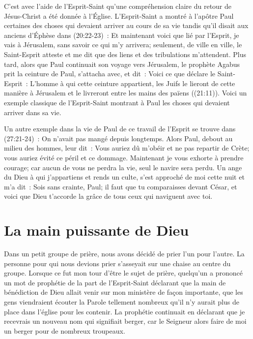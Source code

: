 \begin{specialpar}{}
C'est avec l'aide de l'Esprit-Saint qu'une compréhension claire
 du retour de Jésus-Christ a été donnée à l'Église.
 L'Esprit-Saint a montré à l'apôtre Paul certaines des choses
 qui devaient arriver au cours de sa vie tandis qu'il disait aux anciens d'Éphèse
 dans (20:22-23)~:
 \og Et maintenant voici que lié par l'Esprit, je vais à Jérusalem,
 sans savoir ce qui m'y arrivera; seulement, de ville en ville,
 le Saint-Esprit atteste et me dit que des liens
 et des tribulations m'attendent. \fg{}
 Plus tard, alors que Paul continuait son voyage vers Jérusalem,
 le prophète Agabus prit la ceinture de Paul, s'attacha avec, et dit~:
 \og Voici ce que déclare le Saint-Esprit~:
 L'homme à qui cette ceinture appartient, les Juifs le lieront
 de cette manière à Jérusalem et le livreront
 entre les mains des païens \fg{} ((21:11)).
 Voici un exemple classique de l'Esprit-Saint montrant à Paul
 les choses qui devaient arriver dans sa vie.
\end{specialpar}

Un autre exemple dans la vie de Paul de ce travail de l'Esprit
 se trouve dans (27:21-24)~:
 \og On n'avait pas mangé depuis longtemps.
 Alors Paul, debout au milieu des hommes, leur dit~:
 Vous auriez dû m'obéir et ne pas repartir de Crète;
 vous auriez évité ce péril et ce dommage.
 Maintenant je vous exhorte à prendre courage;
 car aucun de vous ne perdra la vie, seul le navire sera perdu.
 Un ange du Dieu à qui j'appartiens et rends un culte,
 s'est approché de moi cette nuit et m'a dit~:
 Sois sans crainte, Paul; il faut que tu comparaisses devant César,
 et voici que Dieu t'accorde la grâce de tous ceux qui naviguent avec toi. \fg{}


\section*{La main puissante de Dieu}

Dans un petit groupe de prière, nous avons décidé de prier
 l'un pour l'autre.
 La personne pour qui nous devions prier s'asseyait sur une chaise
 au centre du groupe. Lorsque ce fut mon tour d'être le sujet de prière,
 quelqu'un a prononcé un mot de prophétie de la part de l'Esprit-Saint
 déclarant que la main de bénédiction de Dieu allait venir
 sur mon ministère de façon importante, que les gens viendraient écouter
 la Parole tellement nombreux qu'il n'y aurait plus de place dans l'église
 pour les contenir.
 La prophétie continuait en déclarant que je recevrais un nouveau nom
 qui signifiait berger, car le Seigneur alors faire de moi un berger
 pour de nombreux troupeaux.

